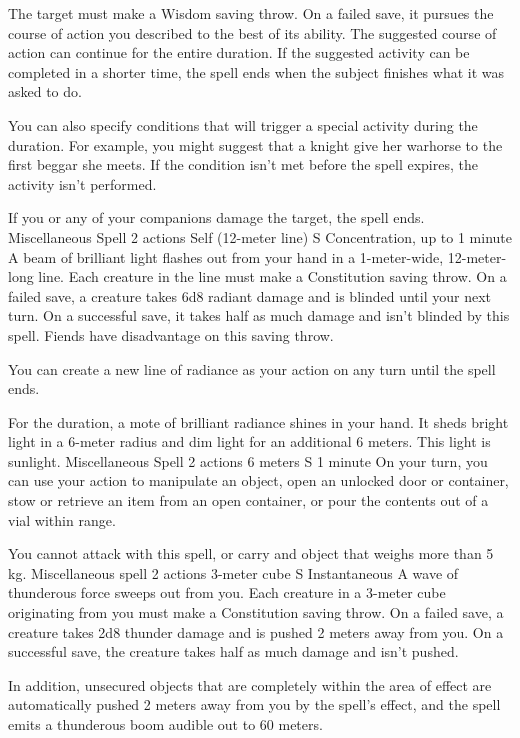     The target must make a Wisdom saving throw.
    On a failed save, it pursues the course of action you described to the best of its ability.
    The suggested course of action can continue for the entire duration.
    If the suggested activity can be completed in a shorter time, the spell ends when the subject finishes what it was asked to do.

    You can also specify conditions that will trigger a special activity during the duration.
    For example, you might suggest that a knight give her warhorse to the first beggar she meets.
    If the condition isn't met before the spell expires, the activity isn't performed.

    If you or any of your companions damage the target, the spell ends.
    {Miscellaneous Spell}
    {2 actions}
    {Self (12-meter line)}
    {S}
    {Concentration, up to 1 minute}
    A beam of brilliant light flashes out from your hand in a 1-meter-wide, 12-meter-long line.
    Each creature in the line must make a Constitution saving throw.
    On a failed save, a creature takes 6d8 radiant damage and is blinded until your next turn.
    On a successful save, it takes half as much damage and isn't blinded by this spell.
    Fiends have disadvantage on this saving throw.

    You can create a new line of radiance as your action on any turn until the spell ends.

    For the duration, a mote of brilliant radiance shines in your hand.
    It sheds bright light in a 6-meter radius and dim light for an additional 6 meters.
    This light is sunlight.
    {Miscellaneous Spell}
    {2 actions}
    {6 meters}
    {S}
    {1 minute}
    On your turn, you can use your action to manipulate an object, open an unlocked door or container, stow or retrieve an item from an open container, or pour the contents out of a vial within range.

    You cannot attack with this spell, or carry and object that weighs more than 5 kg.
    {Miscellaneous spell}
    {2 actions}
    {3-meter cube}
    {S}
    {Instantaneous}
    A wave of thunderous force sweeps out from you.
    Each creature in a 3-meter cube originating from you must make a Constitution saving throw.
    On a failed save, a creature takes 2d8 thunder damage and is pushed 2 meters away from you.
    On a successful save, the creature takes half as much damage and isn't pushed.

    In addition, unsecured objects that are completely within the area of effect are automatically pushed 2 meters away from you by the spell's effect, and the spell emits a thunderous boom audible out to 60 meters.
